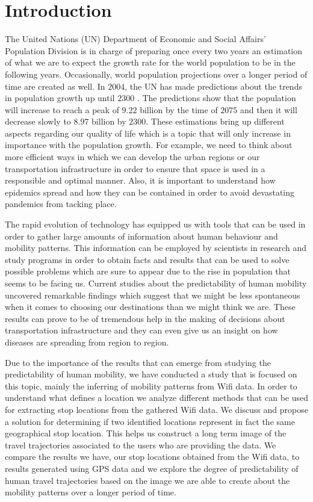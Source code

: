 \chapter{Introduction}

The United Nations (UN) Department of Economic and Social Affairs' Population
Division is in charge of preparing once every two years an estimation of what we
are to expect the growth rate for the world population to be in the following
years. Occasionally, world population projections over a longer period of time
are created as well. In $2004$, the UN has made predictions about the trends in
population growth up until $2300$ \cite{UNWp}. The predictions show that the
population will increase to reach a peak of $9.22$ billion by the time of $2075$
and then it will decrease slowly to $8.97$ billion by $2300$. These estimations
bring up different aspects regarding our quality of life which is a topic that
will only increase in importance with the population growth. For example, we
need to think about more efficient ways in which we can develop the urban
regions or our transportation infrastructure in order to ensure that space is
used in a responsible and optimal manner. Also, it is important to understand
how epidemics spread and how they can be contained in order to avoid devastating
pandemics from tacking place.

The rapid evolution of technology has equipped us with tools that can be used in
order to gather large amounts of information about human behaviour and mobility
patterns. This information can be employed by scientists in research and study
programs in order to obtain facts and results that can be used to solve possible
problems which are sure to appear due to the rise in population that seems to be
facing us. Current studies about the predictability of human mobility uncovered
remarkable findings which suggest that we might be less spontaneous when it
comes to choosing our destinations than we might think we are. These results can
prove to be of tremendous help in the making of decisions about transportation
infrastructure and they can even give us an insight on how diseases are
spreading from region to region.

Due to the importance of the results that can emerge from studying the
predictability of human mobility, we have conducted a study that is focused on
this topic, mainly the inferring of mobility patterns from Wifi data. In order
to understand what defines a location we analyze different methods that can be
used for extracting stop locations from the gathered Wifi data. We discuss and
propose a solution for determining if two identified locations represent in fact
the same geographical stop location. This helps us construct a long term image
of the travel trajectories associated to the users who are providing the data.
We compare the results we have, our stop locations obtained from the Wifi data,
to results generated using GPS data and we explore the degree of predictability
of human travel trajectories based on the image we are able to create about the
mobility patterns over a longer period of time.

